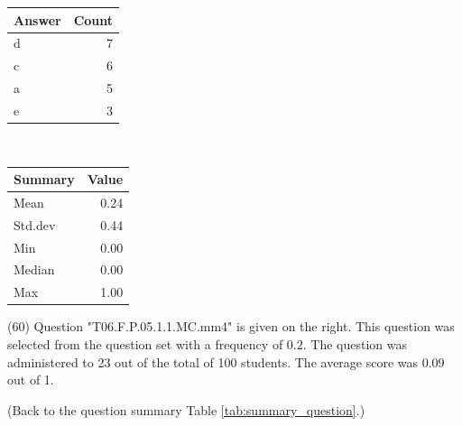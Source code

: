 \documentclass[12pt,nohyper]{tufte-handout}\usepackage[]{graphicx}\usepackage[]{color}
\begin{document}
\begin{center}%
\begin{tabular}{lr}
  \hline
Answer & Count \\ 
  \hline
d &   7 \\ 
  c &   6 \\ 
  a &   5 \\ 
  e &   3 \\ 
   \hline
\end{tabular}
~~~~~~~~%
\begin{tabular}{lr}
  \hline
Summary & Value \\ 
  \hline
Mean & 0.24 \\ 
  Std.dev & 0.44 \\ 
  Min & 0.00 \\ 
  Median & 0.00 \\ 
  Max & 1.00 \\ 
   \hline
\end{tabular}
\end{center}\newpage{} (60) Question "T06.F.P.05.1.1.MC.mm4" is given on the right. This question was selected from the question set with a frequency of 0.2. The question was administered to 23 out of the total of 100 students. The average score was 0.09 out of 1.

 (Back to the question summary Table \ref{tab:summary_question}.)
\end{document}
